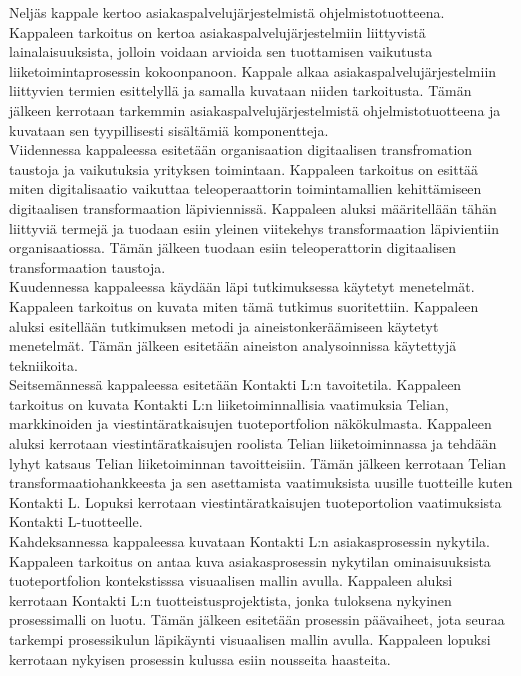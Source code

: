\documentclass[finnish,12pt,a4paper,pdftex]{article}
\begin{document}
Neljäs kappale kertoo asiakaspalvelujärjestelmistä ohjelmistotuotteena. Kappaleen tarkoitus on kertoa asiakaspalvelujärjestelmiin liittyvistä lainalaisuuksista, jolloin voidaan arvioida sen tuottamisen vaikutusta liiketoimintaprosessin kokoonpanoon. Kappale alkaa asiakaspalvelujärjestelmiin liittyvien termien esittelyllä ja samalla kuvataan niiden tarkoitusta. Tämän jälkeen kerrotaan tarkemmin asiakaspalvelujärjestelmistä ohjelmistotuotteena ja kuvataan sen tyypillisesti sisältämiä komponentteja. \\

Viidennessa kappaleessa esitetään organisaation digitaalisen transfromation taustoja ja vaikutuksia yrityksen toimintaan. Kappaleen tarkoitus on esittää miten digitalisaatio vaikuttaa teleoperaattorin toimintamallien kehittämiseen digitaalisen transformaation läpiviennissä. Kappaleen aluksi määritellään tähän liittyviä termejä ja tuodaan esiin yleinen viitekehys transformaation läpivientiin organisaatiossa. Tämän jälkeen tuodaan esiin teleoperattorin digitaalisen transformaation taustoja. \\

Kuudennessa kappaleessa käydään läpi tutkimuksessa käytetyt menetelmät. Kappaleen tarkoitus on kuvata miten tämä tutkimus suoritettiin. Kappaleen aluksi esitellään tutkimuksen metodi ja aineistonkeräämiseen käytetyt menetelmät. Tämän jälkeen esitetään aineiston analysoinnissa käytettyjä tekniikoita.\\

Seitsemännessä kappaleessa esitetään Kontakti L:n tavoitetila. Kappaleen tarkoitus on kuvata Kontakti L:n liiketoiminnallisia vaatimuksia Telian, markkinoiden ja viestintäratkaisujen tuoteportfolion näkökulmasta. Kappaleen aluksi kerrotaan viestintäratkaisujen roolista Telian liiketoiminnassa ja tehdään lyhyt katsaus Telian liiketoiminnan tavoitteisiin. Tämän jälkeen kerrotaan Telian transformaatiohankkeesta ja sen asettamista vaatimuksista uusille tuotteille kuten Kontakti L. Lopuksi kerrotaan viestintäratkaisujen tuoteportolion vaatimuksista Kontakti L-tuotteelle.\\

Kahdeksannessa kappaleessa kuvataan Kontakti L:n asiakasprosessin nykytila. Kappaleen tarkoitus on antaa kuva asiakasprosessin nykytilan ominaisuuksista tuoteportfolion kontekstisssa visuaalisen mallin avulla. Kappaleen aluksi kerrotaan Kontakti L:n tuotteistusprojektista, jonka tuloksena nykyinen prosessimalli on luotu. Tämän jälkeen esitetään prosessin päävaiheet, jota seuraa tarkempi prosessikulun läpikäynti visuaalisen mallin avulla. Kappaleen lopuksi kerrotaan nykyisen prosessin kulussa esiin nousseita haasteita.\\
\end{document}
